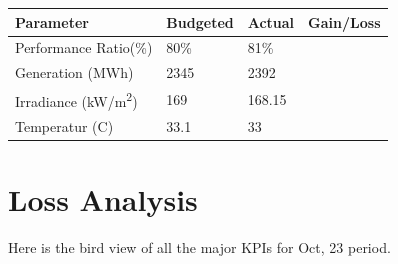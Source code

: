 \documentclass[18pt]{article}
\begin{document}
\begin{center}
\begin{tabular} { |R{4cm}|L{2cm}|L{2cm}|L{2cm}| }
	\hline
	Parameter & Budgeted & Actual & Gain/Loss\\
	\hline
	Performance Ratio(\%) & 80\% & 81\% &  \\
	Generation (MWh) & 2345 & 2392 &  \\
	Irradiance (kW/m\textsuperscript{2}) & 169 & 168.15 &  \\
	Temperatur (C) & 33.1 & 33 &  \\
	\hline
\end{tabular}
\end{center}



\section{Loss Analysis}
 Here is the bird view of all the major KPIs for Oct, 23 period. 
 
\end{document}
